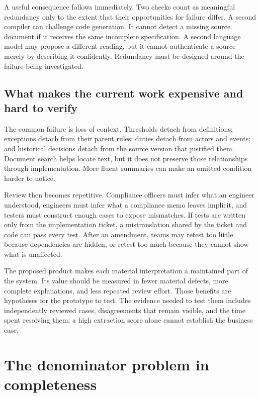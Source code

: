 \documentclass[12pt,a4paper,oneside,openany]{book}
\begin{document}
A useful consequence follows immediately. Two checks count as meaningful
redundancy only to the extent that their opportunities for failure differ. A
second compiler can challenge code generation. It cannot detect a missing source
document if it receives the same incomplete specification. A second language
model may propose a different reading, but it cannot authenticate a source merely
by describing it confidently. Redundancy must be designed around the failure
being investigated.

\subsection{What makes the current work expensive and hard to verify}
\label{merge:P-01-problem:05}


The common failure is loss of context. Thresholds detach from definitions;
exceptions detach from their parent rules; duties detach from actors and events;
and historical decisions detach from the source version that justified them.
Document search helps locate text, but it does not preserve those relationships
through implementation. More fluent summaries can make an omitted condition
harder to notice.

Review then becomes repetitive. Compliance officers must infer what an engineer
understood, engineers must infer what a compliance memo leaves implicit, and
testers must construct enough cases to expose mismatches. If tests are written
only from the implementation ticket, a mistranslation shared by the ticket and
code can pass every test. After an amendment, teams may retest too little because
dependencies are hidden, or retest too much because they cannot show what is
unaffected.

The proposed product makes each material interpretation a maintained part of the
system. Its value should be measured in fewer material defects, more complete
explanations, and less repeated review effort. Those benefits are hypotheses for
the prototype to test. The evidence needed to test them includes independently
reviewed cases, disagreements that remain visible, and the time spent resolving
them; a high extraction score alone cannot establish the business case.

\section{The denominator problem in completeness}
\label{merge:M01:03}
\end{document}
